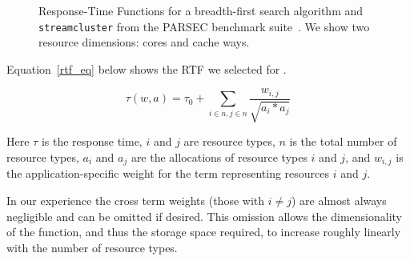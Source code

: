 \begin{figure}[hb]
\caption{\label{sample_rtf} Response-Time Functions for a
  breadth-first search algorithm and \texttt{streamcluster} from the PARSEC benchmark suite~\cite{parsec}. We show two resource dimensions: cores and cache ways.}
\end{figure}

Equation~\ref{rtf_eq} below shows the RTF we selected for \pacora.  

\begin{equation}\label{rtf_eq}
\tau(w,a) = \tau_0 + \sum_{i\in n,j\in n}{\frac{w_{i,j}}{\sqrt{a_i * a_j}}}
\end{equation}

Here $\tau$ is the response time, $i$ and $j$ are
resource types, $n$ is the total number of resource types,
$a_{i}$ and $a_{j}$ are the allocations of resource types $i$
and $j$, and $w_{i,j}$ is the application-specific weight for
the term representing resources $i$ and $j$.

In our experience the cross term weights (those with $i\neq j$) are almost always negligible and can be omitted if desired.
This omission allows the dimensionality of the function, and thus the storage space required, to increase roughly linearly with the number of resource types.

